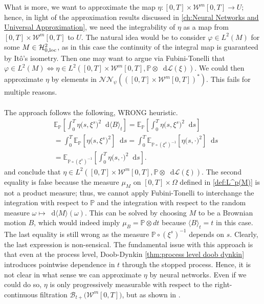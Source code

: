 \documentclass[11pt,a4paper,twoside,openany]{report}
\newcommand{\diff}{\mathop{}\!\mathrm{d}}
\theoremstyle{plain} %
\theoremstyle{definition} %
\theoremstyle{remark} %
\let\parencite\authnumparencite
\begin{document}
 What is more, we want to approximate the map \(\eta:[0,T]\times\mathcal{W}^m[0,T]\to U\); hence, in light of the approximation results discussed in \cref{ch:Neural Networks and Universal Approximation}, we need the integrability of \(\eta\) as a map from \([0,T]\times\mathcal{W}^m[0,T]\) to \(U\). The natural idea would be to consider \(\varphi\in L^2(M)\) for some \(M\in\mathcal{H}_{0,\rm{loc}}^2\), as in this case the continuity of the integral map is guaranteed by Itô's isometry. Then one may want to argue via Fubini-Tonelli that \(\varphi\in L^2(M)\iff \eta\in L^2([0,T]\times\mathcal{W}^m[0,T],\mathbb{P}\otimes\diff\mathcal{L}(\xi))\). We could then approximate \(\eta\) by elements in \(\mathcal{NN}_\psi(\left([0,T]\times\mathcal{W}^m[0,T]\right)^*)\). This fails for multiple reasons. \\\\
The approach follows the following, WRONG heuristic.
\begin{align}
   & \mathbb{E}_{\mathbb{P}}[\int_0^T\eta\bigg(s,\xi^s\bigg)^2\diff \langle B\rangle_t]= \mathbb{E}_{\mathbb{P}}[\int_0^T\eta\bigg(s,\xi^s\bigg)^2\diff s]
   \\&=\int_0^T\mathbb{E}_{\mathbb{P}}[\eta\bigg(s,\xi^s\bigg)^2]\diff s=\int_0^T\mathbb{E}_{\mathbb{P}\circ (\xi^{s})^{-1}}[\eta\bigg(s,\cdot\bigg)^2]\diff s
   \\&=\mathbb{E}_{\mathbb{P}\circ (\xi^{s})^{-1}}[\int_0^T\eta\bigg(s,\cdot\bigg)^2\diff s].
\end{align}
and conclude that \(\eta\in L^2([0,T]\times\mathcal{W}^m[0,T],\mathbb{P}\otimes\diff\mathcal{L}(\xi))\). The second equality is false because the measure \(\mu_M\) on \([0,T]\times \Omega\) defined in \cref{def:L^p(M)} is not a product measure; thus, we cannot apply Fubini-Tonelli to interchange the integration with respect to \(\mathbb{P}\) and the integration with respect to the random measure \(\omega\mapsto \diff \langle M\rangle(\omega)\). This can be solved by choosing \(M\) to be a Brownian motion \(B\), which would indeed imply \(\mu_B=\mathbb{P}\otimes dt\) because \(\langle B\rangle_t=t\) in this case. The last equality is still wrong as the measure \(\mathbb{P}\circ (\xi^{s})^{-1}\) depends on \(s\). Clearly, the last expression is non-sensical. The fundamental issue with this approach is that even at the process level, Doob-Dynkin \cref{thm:process level doob dynkin} introduces pointwise dependence in \(t\) through the stopped process. 
Hence, it is not clear in what sense we can approximate \(\eta\) by neural networks. Even if we could do so, \(\eta\) is only progressively measurable with respect to the right-continuous filtration \(\mathcal{B}_{t+}\bigg(\mathcal{W}^m[0,T]\bigg)\), but as shown in \parencite[Problem.~7.1]{KaratzasShreve1991Brownian}.
\end{document}
